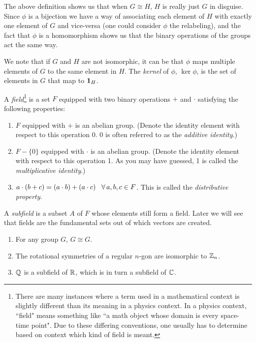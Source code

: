The above definition shows us that when $G\cong H$, $H$ is really just $G$ in
disguise. Since $\phi$ is a bijection we have a way of associating each element
of $H$ with exactly one element of $G$ and vice-versa (one could consider 
$\phi$ the relabeling), and the fact that $\phi$ is a homomorphism shows us
that the binary operations of the groups act the same way.

We note that if $G$ and $H$ are not isomorphic, it can be that $\phi$ maps
multiple elements of $G$ to the same element in $H$. The {\it
kernel} of $\phi$, $\ker\phi$, is the set of elements in $G$ that map
to ${\mathbf 1}_H$. 


A {\it field}\footnote{There are many instances where a term used in
a mathematical context is slightly different than its meaning in
a physics context. In a physics context, ``field" means something like
``a math object whose domain is every space-time point".
Due to these differing conventions, one usually has to determine based
on context which kind of field is meant.} 
is a set $F$ equipped with two binary
  operations  $+$ and $\cdot$  satisfying the following properties:
  \begin{enumerate}
    \item $F$ equipped with $+$ is an abelian group. (Denote the 
          identity element with respect to this operation 0. 0 is often 
          referred to as the {\it additive identity}.)
    \item $F-\{0\}$ equipped with $\cdot$ is an abelian group. (Denote the
          identity element with respect to this operation 1. As you may have
          guessed, 1 is called the 
          {\it multiplicative identity}.)
    \item $a\cdot (b+c)=(a\cdot b)+(a\cdot c)\ \ \Forall a,b,c\in F$. This is
          called the {\it distributive property}.
  \end{enumerate}
A {\it subfield} 
is a subset $A$ of $F$ whose elements still form a field.
Later we will see that fields are the fundamental sets out of
which vectors are created.

\begin{example*}{}{}
\begin{enumerate}
  \item For any group $G$, $G\cong G$.
  \item The rotational symmetries of a regular $n$-gon are isomorphic to
        $\mathbb{Z}_n$.
  \item $\mathbb{Q}$ is a subfield of $\mathbb{R}$, which is in turn a subfield of $\mathbb{C}$.
\end{enumerate}
\end{example*}

